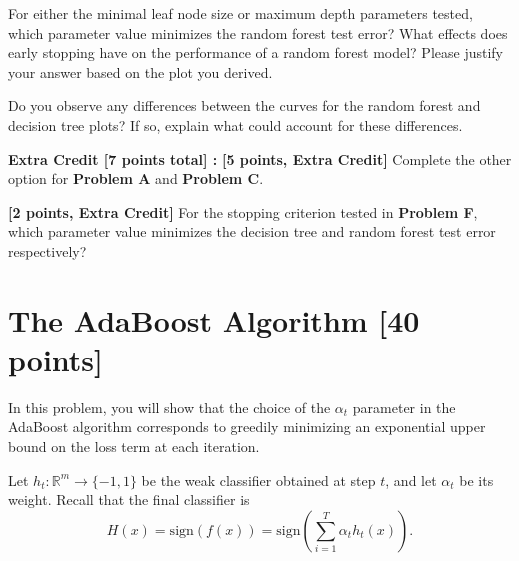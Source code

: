 \problem[6]
For either the minimal leaf node size or maximum depth parameters tested, which parameter value minimizes the random forest test error? What effects does early stopping have on the performance of a random forest model?
Please justify your answer based on the plot you derived.

\begin{solution}

\end{solution}

\problem[4]
Do you observe any differences between the curves for the random forest and decision tree plots? If so, explain what could account for these differences.

\begin{solution}

\end{solution}

\textbf{Extra Credit [7 points total] :} \problem\textbf{[5 points, Extra Credit]} Complete the other option for \textbf{Problem A }and \textbf{Problem C}.

\begin{solution}
   
\end{solution}

\problem\textbf{[2 points, Extra Credit] }For the stopping criterion tested in \textbf{Problem F}, which parameter value minimizes the decision tree and random forest test error respectively? 

\begin{solution}
   
\end{solution}



\newpage
\section{The AdaBoost Algorithm [40 points]}

In this problem, you will show that the choice of the $\alpha_t$ parameter in
the AdaBoost algorithm corresponds to greedily minimizing an exponential upper
bound on the loss term at each iteration.

\problem[3]
Let $h_t: \mathbb{R}^m \rightarrow \{-1,1\}$ be the weak classifier obtained at step $t$, and let $\alpha_t$ be
its weight. Recall that the final classifier is $$H(x) = \text{sign}(f(x)) = \text{sign} \left(\sum\limits_{i=1}^T \alpha_{t}h_t(x) \right).$$

